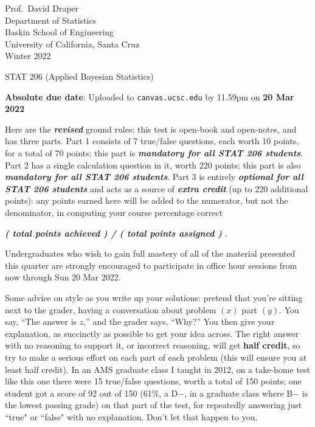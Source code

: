 \documentclass[12pt]{article}
\newcommand{\bi}[1]{\textbf{\textit{#1}}}
\begin{document}
\begin{flushleft}

Prof.~David Draper \\
Department of Statistics \\
Baskin School of Engineering \\
University of California, Santa Cruz \\
Winter 2022

\end{flushleft}

\Large

\begin{center}

STAT 206 (\textsf{Applied Bayesian Statistics})


\large

\textbf{Absolute due date}: Uploaded to \texttt{canvas.ucsc.edu} by 11.59pm on \textbf{20 Mar 2022}

\end{center}

\normalsize

Here are the \bi{revised} ground rules: this test is open-book and open-notes, and has three parts. Part 1 consists of 7 true/false questions, each worth 10 points, for a total of 70 points; this part is \bi{mandatory for all STAT 206 students}. Part 2 has a single calculation question in it, worth 220 points; this part is also \bi{mandatory for all STAT 206 students}. Part 3 is entirely \bi{optional for all STAT 206 students} and acts as a source of \bi{extra credit} (up to 220 additional points): any points earned here will be added to the numerator, but not the denominator, in computing your course percentage correct 

\hspace*{0.5in}\bi{( total points achieved ) / ( total points assigned )} .

Undergraduates who wish to gain full mastery of all of the material presented this quarter are strongly encouraged to participate in office hour sessions from now through Sun 20 Mar 2022.

Some advice on style as you write up your solutions: pretend that you're sitting next to the grader, having a conversation about problem $( x )$ part $( y )$. You say, ``The answer is $z$,'' and the grader says, ``Why?'' You then give your explanation, as succinctly as possible to get your idea across. The right answer with no reasoning to support it, or incorrect reasoning, will get \textbf{half credit}, so try to make a serious effort on each part of each problem (this will ensure you at least half credit). In an AMS graduate class I taught in 2012, on a take-home test like this one there were 15 true/false questions, worth a total of 150 points; one student got a score of 92 out of 150 (61\%, a D$-$, in a graduate class where B$-$ is the lowest passing grade) on that part of the test, for repeatedly answering just ``true" or ``false" with no explanation. Don't let that happen to you.  
\end{document}
